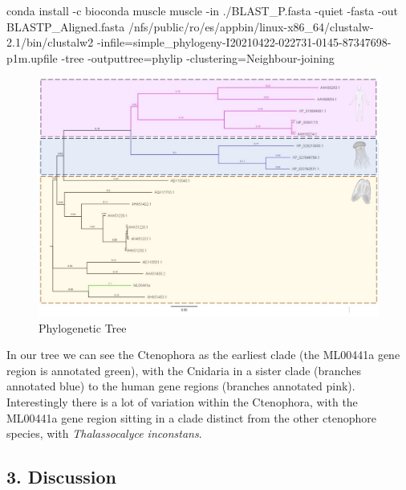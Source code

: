\documentclass[
]{article}
\newenvironment{Shaded}{\begin{snugshade}}{\end{snugshade}}
\newcommand{\ExtensionTok}[1]{#1}
\newcommand{\NormalTok}[1]{#1}
\begin{document}
\begin{Shaded}
\begin{Highlighting}[]
\ExtensionTok{conda}\NormalTok{ install {-}c bioconda muscle}
\ExtensionTok{muscle}\NormalTok{ {-}in ./BLAST\_P.fasta {-}quiet {-}fasta {-}out BLASTP\_Aligned.fasta}
\ExtensionTok{/nfs/public/ro/es/appbin/linux{-}x86\_64/clustalw{-}2.1/bin/clustalw2}\NormalTok{ {-}infile=simple\_phylogeny{-}I20210422{-}022731{-}0145{-}87347698{-}p1m.upfile {-}tree {-}outputtree=phylip {-}clustering=Neighbour{-}joining}
\end{Highlighting}
\end{Shaded}

\begin{figure}
\centering
\includegraphics{BLAST_PTree1.jpg}
\caption{Phylogenetic Tree}
\end{figure}

In our tree we can see the Ctenophora as the earliest clade (the
ML00441a gene region is annotated green), with the Cnidaria in a sister
clade (branches annotated blue) to the human gene regions (branches
annotated pink). Interestingly there is a lot of variation within the
Ctenophora, with the ML00441a gene region sitting in a clade distinct
from the other ctenophore species, with \emph{Thalassocalyce
inconstans}.

\hypertarget{discussion}{%
\subsection{3. Discussion}\label{discussion}}
\end{document}
